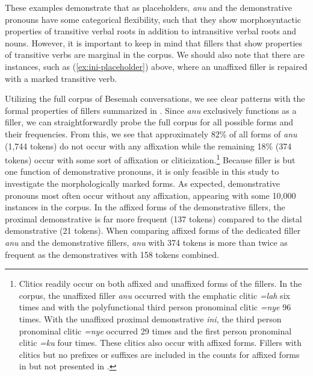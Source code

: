 \documentclass[output=paper,
\ChapterDOI{10.5281/zenodo.15697583}
colorlinks,
citecolor=brown]{langscibook}
\begin{document}
These examples demonstrate that as placeholders, \textit{anu} and the demonstrative pronouns have some categorical flexibility, such that they show morphosyntactic properties of transitive verbal roots in addition to intransitive verbal roots and nouns. However, it is important to keep in mind that fillers that show properties of transitive verbs are marginal in the corpus. We should also note that there are instances, such as (\ref{ex:ini-placeholder}) above, where an unaffixed filler is repaired with a marked transitive verb.  

Utilizing the full corpus of Besemah conversations, we see clear patterns with the formal properties of fillers summarized in . Since \textit{anu} exclusively functions as a filler, we can straightforwardly probe the full corpus for all possible forms and their frequencies. From this, we see that approximately 82\% of all forms of \textit{anu} (1,744 tokens) do not occur with any affixation while the remaining 18\% (374 tokens) occur with some sort of affixation or cliticization.\footnote{Clitics readily occur on both affixed and unaffixed forms of the fillers. In the corpus, the unaffixed filler \textit{anu} occurred with the emphatic clitic \textit{=lah} six times and with the polyfunctional third person pronominal clitic \textit{=nye} 96 times. With the unaffixed proximal demonstrative \textit{ini}, the third person pronominal clitic \textit{=nye} occurred 29 times and the first person pronominal clitic \textit{=ku} four times. These clitics also occur with affixed forms. Fillers with clitics but no prefixes or suffixes are included in the counts for affixed forms in  but  not presented in .} Because filler is but one function of demonstrative pronouns, it is only feasible in this study to investigate the morphologically marked forms. As expected, demonstrative pronouns most often occur without any affixation, appearing with some 10,000 instances in the corpus. In the affixed forms of the demonstrative fillers, the proximal demonstrative is far more frequent (137 tokens) compared to the distal demonstrative (21 tokens). When comparing affixed forms of the dedicated filler \textit{anu} and the demonstrative fillers, \textit{anu} with 374 tokens is more than twice as frequent as the demonstratives with 158 tokens combined.
\end{document}
